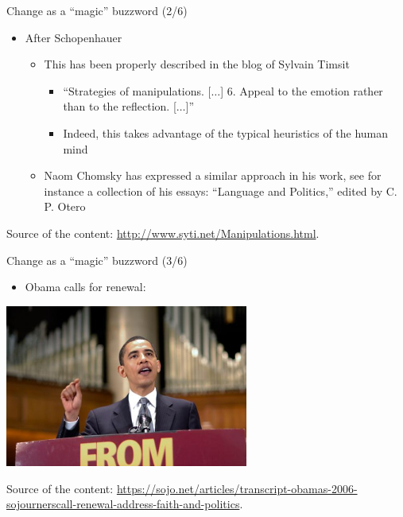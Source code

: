 \documentclass{beamer}
\begin{document}
\begin{frame}
{\centerline{Change as a ``magic'' buzzword (2/6)}}
 
\begin{itemize}
\item After Schopenhauer
 \begin{itemize}
\item This has been properly described in the blog of Sylvain Timsit 
 \begin{itemize}
\item ``Strategies of manipulations. [$\ldots{}$] 6. Appeal to the emotion rather than to the reflection. [$\ldots{}$]''
  \item Indeed, this takes advantage of the typical heuristics of the human mind
\end{itemize} 
\item Naom Chomsky has expressed a similar approach in his work, see for instance a collection of his essays: ``Language and Politics,'' edited by C. P. Otero
 \end{itemize} 
  \end{itemize} 
  
\begin{center}
\tiny
Source of the content: \url{http://www.syti.net/Manipulations.html}.
\end{center}



\end{frame}

\begin{frame}
{\centerline{Change as a ``magic'' buzzword (3/6)}}
 
\begin{itemize}
 \item Obama calls for renewal:
 \end{itemize} 
\begin{center}
 \includegraphics[width=8cm]{P2023.AIBCCSS.Change/change.Obama.jpg}
 
 \end{center}
 
\begin{center}
\tiny
Source of the content: \url{https://sojo.net/articles/transcript-obamas-2006-sojournerscall-renewal-address-faith-and-politics}.
\end{center}
\end{frame}
\end{document}
